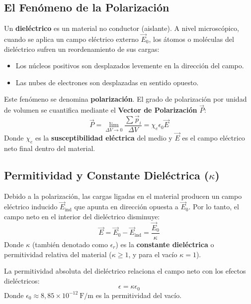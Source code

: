 \documentclass[12pt, a4paper]{article}
\begin{document}
\subsection{El Fenómeno de la Polarización}
Un \textbf{dieléctrico} es un material no conductor (aislante). A nivel microscópico, cuando se aplica un campo eléctrico externo $\vec{E}_0$, los átomos o moléculas del dieléctrico sufren un reordenamiento de sus cargas:
\begin{itemize}
    \item Los núcleos positivos son desplazados levemente en la dirección del campo.
    \item Las nubes de electrones son desplazadas en sentido opuesto.
\end{itemize}
Este fenómeno se denomina \textbf{polarización}. El grado de polarización por unidad de volumen se cuantifica mediante el \textbf{Vector de Polarización} $\vec{P}$:
\begin{equation}
    \vec{P} = \lim_{\Delta V \to 0} \frac{\sum \vec{p}_i}{\Delta V} = \chi_e \epsilon_0 \vec{E}
\end{equation}
Donde $\chi_e$ es la \textbf{susceptibilidad eléctrica} del medio y $\vec{E}$ es el campo eléctrico neto final dentro del material.

\subsection{Permitividad y Constante Dieléctrica ($\kappa$)}
Debido a la polarización, las cargas ligadas en el material producen un campo eléctrico inducido $\vec{E}_{\text{ind}}$ que apunta en dirección opuesta a $\vec{E}_0$. Por lo tanto, el campo neto en el interior del dieléctrico disminuye:
\begin{equation}
    \vec{E} = \vec{E}_0 - \vec{E}_{\text{ind}} = \frac{\vec{E}_0}{\kappa}
\end{equation}
Donde $\kappa$ (también denotado como $\epsilon_r$) es la \textbf{constante dieléctrica} o permitividad relativa del material ($\kappa \ge 1$, y para el vacío $\kappa = 1$).

\begin{definicion}
La permitividad absoluta del dieléctrico relaciona el campo neto con los efectos dieléctricos:
\begin{equation}
    \epsilon = \kappa \epsilon_0
\end{equation}
Donde $\epsilon_0 \approx 8{,}85 \times 10^{-12}\ \text{F/m}$ es la permitividad del vacío.
\end{definicion}
\end{document}

